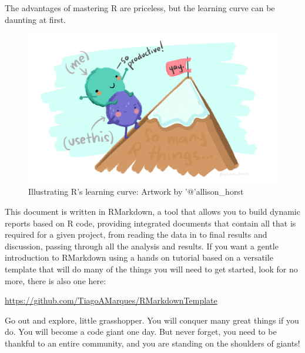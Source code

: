 \documentclass[
]{article}
\begin{document}
The advantages of mastering R are priceless, but the learning curve can
be daunting at first.

\begin{figure}
\centering
\includegraphics{extfiles/usethis.png}
\caption{Illustrating R's learning curve: Artwork by '@'allison\_horst}
\end{figure}

This document is written in RMarkdown, a tool that allows you to build
dynamic reports based on R code, providing integrated documents that
contain all that is required for a given project, from reading the data
in to final results and discussion, passing through all the analysis and
results. If you want a gentle introduction to RMarkdown using a hands on
tutorial based on a versatile template that will do many of the things
you will need to get started, look for no more, there is also one here:

\url{https://github.com/TiagoAMarques/RMarkdownTemplate}

Go out and explore, little grasshopper. You will conquer many great
things if you do. You will become a code giant one day. But never
forget, you need to be thankful to an entire community, and you are
standing on the shoulders of giants!
\end{document}
